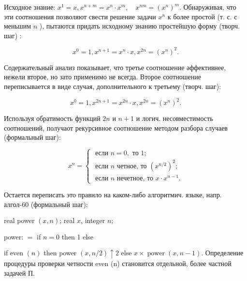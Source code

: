 \documentclass[10pt]{article}
\begin{document}
Исходное знание: $x^{1}=x, x^{n+m}=x^{n} \cdot x^{m}, \quad x^{n m}=\left(x^{n}\right)^{m}$. Обнаруживая, что эти соотношения позволяют свести решение задачи $x^{n}$ к более простой (т. с. с меньшим $n$ ), пытаются придать исходному знанию простейшую форму (творч. шаг) :



\[

x^{0}=1, x^{n+1}=x^{n} \cdot x, x^{2 n}=\left(x^{n}\right)^{2} .

\]



Содержательный анализ показывает, что третье соотношение әффективнее, нежели второе, но зато применимо не всегда. Второе соотношение переписывается в виде случая, дополнительного к третьему (творч. шаг):



\[

x^{0}=1, x^{2 n+1}=x^{2 n} \cdot x, x^{2 n}=\left(x^{n}\right)^{2} .

\]



Используя обратимость функций $2 n$ и $n+1$ и логич. несовместимость соотношений, получаот рекурсивное соотношение методом разбора случаев (формальный шаг):



\[

x^{n}=\left\{\begin{array}{l}

\text { если } n=0, \text { то } 1 ; \\

\text { если } n \text { четное, то }\left(x^{n / 2}\right)^{2} ; \\

\text { если } n \text { нечетное, то } x \cdot x^{n-1} .

\end{array}\right.

\]



Остается переписать это правило на каком-либо алгоритмич. языке, напр. алгол-60 (формальный шаг):



real power $(x, n)$; real $x$, integer $n$;



power: $=$ if $n=0$ then 1 else



if even $(n)$ then power $(x, n / 2) \uparrow 2$ else $x \times \operatorname{power}(x, n-1)$. Определение процедуры проверки четности even (n) становится отдельной, более частной задачей П.
\end{document}
